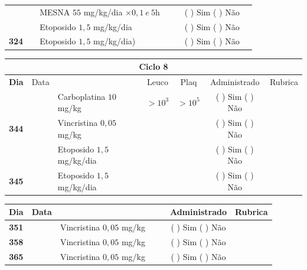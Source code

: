\documentclass[11pt,a4paper,oldfontcommands]{memoir}
\begin{document}
\begin{center}
\begin{table}[H]
\begin{tabular}{p{1cm}c|p{4.8cm}|p{1.8cm}p{1.8cm}|c|c}
    \cline{4-5}
    \multicolumn{1}{c|}{}&&{MESNA \(55\) mg/kg/dia \(\times 0,1 \:e\: 5\)h}&&&{(  ) Sim (  ) Não}&\\
    \multicolumn{1}{c|}{}&&{Etoposido \(1,5\) mg/kg/dia}&&&{(  ) Sim (  ) Não}&\\
    \hline
    \multicolumn{1}{c|}{\multirow{1}{*}{\textbf{324}}}&&{Etoposido \(1,5\) mg/kg/dia)}&{}&&{(  ) Sim (  ) Não}&\\
    \hline
\end{tabular}
\end{table}
\begin{table}[H] \small
\begin{tabular}{p{1cm}c|p{4.8cm}|p{1.8cm}p{1.8cm}|c|c}
	\hline
	\multicolumn{7}{c}{Ciclo 8} \\
	\hline
	\multicolumn{1}{c|}{\multirow{1}{*}{\textbf{Dia}}}&{Data}&{}&\multicolumn{1}{c|}{Leuco}&\multicolumn{1}{c|}{Plaq}&{Administrado}&{Rubrica} \\
    \hline
    \multicolumn{1}{c|}{\multirow{3}{*}{\textbf{344}}}&\multirow{2}{*}{}&{Carboplatina \(10\) mg/kg}&\multicolumn{1}{c|}{\(>10^3\)}&\multicolumn{1}{c|}{\(>10^5\)}&{(  ) Sim (  ) Não}&\\
    \cline{4-5}
    \multicolumn{1}{c|}{}&&{Vincristina \(0,05\) mg/kg}&\multicolumn{1}{c|}{}&&{(  ) Sim (  ) Não}&\\
    \cline{4-5}
    \multicolumn{1}{c|}{}&\multirow{1}{*}{}&{Etoposido \(1,5\) mg/kg/dia}&{}&&{(  ) Sim (  ) Não}&\\
    \cline{1-3}\cline{6-6}
    \multicolumn{1}{c|}{\textbf{345}}&\multirow{1}{*}{}&{Etoposido \(1,5\) mg/kg/dia}&{}&&{(  ) Sim (  ) Não}&\\
    \hline
\end{tabular}
\end{table}
\begin{table}[H] \small
\begin{tabular}{p{1cm}c|p{4.8cm}|p{1.8cm}p{1.8cm}|c|c}
	\hline
	\multicolumn{1}{c|}{\multirow{1}{*}{\textbf{Dia}}}&{Data}&{}&{}&&{Administrado}&{Rubrica} \\
    \hline
    \multicolumn{1}{c|}{\textbf{351}}&&{Vincristina \(0,05\) mg/kg}&\multicolumn{1}{c}{}&&{(  ) Sim (  ) Não}&\\
    \hline
    \multicolumn{1}{c|}{\textbf{358}}&&{Vincristina \(0,05\) mg/kg}&\multicolumn{1}{c}{}&&{(  ) Sim (  ) Não}&\\
    \hline
    \multicolumn{1}{c|}{\textbf{365}}&&{Vincristina \(0,05\) mg/kg}&\multicolumn{1}{c}{}&&{(  ) Sim (  ) Não}&\\

\end{tabular}
\end{table}
\end{center}
\end{document}
